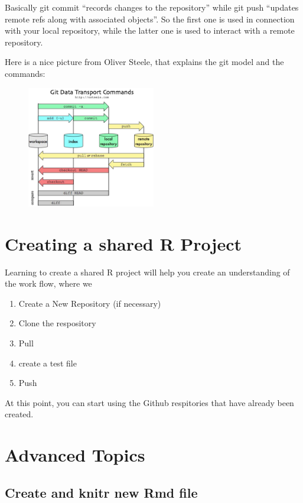 \documentclass[12pt]{../SOP4_alpha}\usepackage[]{graphicx}\usepackage[]{color}
\begin{document}
\begin{description}
  
Basically git commit ``records changes to the repository'' while git push ``updates remote refs along with associated objects''. So the first one is used in connection with your local repository, while the latter one is used to interact with a remote repository.

Here is a nice picture from Oliver Steele, that explains the git model and the commands:  

\begin{figure}
\centering
\includegraphics[width=0.5\textwidth]{graphics/MgaV9}
\end{figure}
   
\end{description}

\section{Creating a shared R Project}

\NP Learning to create a shared R project will help you create an understanding of the work flow, where we 

\begin{enumerate}
\item Create a New Repository (if necessary)
\item Clone the respository
\item Pull 
\item create a test file
\item Push
\end{enumerate}

\NP At this point, you can start using the Github respitories that have already been created.


\section{Advanced Topics}

\subsection{Create and knitr new Rmd file}
\end{document}
